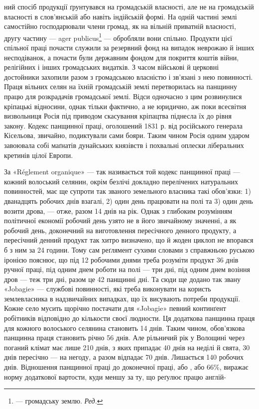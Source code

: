 ний спосіб продукції ґрунтувався на громадській власності, але
не на громадській власності в слов’янській або навіть індійській
формі. На одній частині землі самостійно господарювали члени
громад, як на вільній приватній власності, другу частину — ager
publicus\footnote*{
— громадську землю. \emph{Ред.}
} — обробляли вони спільно. Продукти цієї спільної праці
почасти служили за резервний фонд на випадок неврожаю й інших
несподіванок, а почасти були державним фондом для покриття
коштів війни, релігійних і інших громадських видатків. З часом
військові й церковні достойники захопили разом з громадською
власністю і зв’язані з нею повинності. Праця вільних селян на
їхній громадській землі перетворилась на панщинну працю для
розкрадачів громадської землі. Відси одночасно з цим розвинулися
кріпацькі відносини, однак тільки фактично, а не юридично,
аж поки всесвітня визвольниця Росія під приводом скасування
кріпацтва піднесла їх до рівня закону. Кодекс панщинної праці,
оголошений 1831 р. від російського генерала Кісельова, звичайно,
подиктували сами бояри. Таким чином Росія одним ударом завоювала
собі маґнатів дунайських князівств і похвальні оплески
ліберальних кретинів цілої Европи.

За «Réglement organique» — так називається той кодекс панщинної
праці — кожний волоський селянин, окрім безлічі докладно
перелічених натуральних повинностей, має ще супроти так
званого земельного власника такі обов’язки: 1) дванадцять робочих
днів взагалі, 2) один день працювати на полі та 3) один день
возити дрова, — отже, разом 14 днів на рік. Однак з глибоким розумінням
політичної економії робочий день узято не в його звичайному
значенні, а як робочий день, доконечний на виготовлення
пересічного денного продукту, а пересічний денний продукт так
хитро визначено, що й жоден циклоп не впорався б з ним за
24 години. Тому сам реґлямент сухими словами з справжньою
руською іронією пояснює, що під 12 робочими днями треба розуміти
продукт 36 днів ручної праці, під одним днем роботи на полі —
три дні, під одним днем возіння дров — теж три дні, разом це
42 панщинні дні. Та сюди ще додано так звану «Jobagie» — службові
повинності, які треба виконувати на користь землевласника
в надзвичайних випадках, що їх висувають потреби продукції.
Кожне село мусить щорічно постачати для «Jobagie» певний
континґент робітників відповідно до кількости своєї людности.
Ця додаткова панщинна праця для кожного волоського селянина
становить 14 днів. Таким чином, обов’язкова панщинна праця
становить річно 56 днів. Але рільничий рік у Волощині через
поганий клімат має лише 210 днів, з яких припадає 40 днів на
неділі й свята, 30 днів пересічно — на негоду, а разом відпадає
70 днів. Лишається 140 робочих днів. Відношення панщинної
праці до доконечної праці, або , або 66\%, виражає норму додаткової
вартости, куди меншу за ту, що реґулює працю англій-